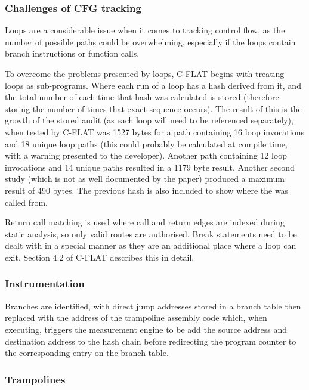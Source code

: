 \subsubsection*{Challenges of CFG tracking}

Loops are a considerable issue when it comes to tracking control flow, as the number of possible paths could be overwhelming, especially if the loops contain branch instructions or function calls.

To overcome the problems presented by loops, C-FLAT \cite{Abera2016} begins with treating loops as sub-programs. Where each run of a loop has a hash derived from it, and the total number of each time that hash was calculated is stored (therefore storing the number of times that exact sequence occurs). The result of this is the growth of the stored audit (as each loop will need to be referenced separately), when tested by C-FLAT was 1527 bytes for a path containing 16 loop invocations and 18 unique loop paths (this could probably be calculated at compile time, with a warning presented to the developer). Another path containing 12 loop invocations and 14 unique paths resulted in a 1179 byte result. Another second study (which is not as well documented by the paper) produced a maximum result of 490 bytes. The previous hash is also included to show where the was called from. 

Return call matching is used where call and return edges are indexed during static analysis, so only valid routes are authorised. Break statements need to be dealt with in a special manner as they are an additional place where a loop can exit. Section 4.2 of C-FLAT \cite{Abera2016} describes this in detail.

\subsubsection*{Instrumentation}

Branches are identified, with direct jump addresses stored in a branch table then replaced with the address of the trampoline assembly code which, when executing, triggers the measurement engine to be add the source address and destination address to the hash chain before redirecting the program counter to the corresponding entry on the branch table.

\subsubsection*{Trampolines}

